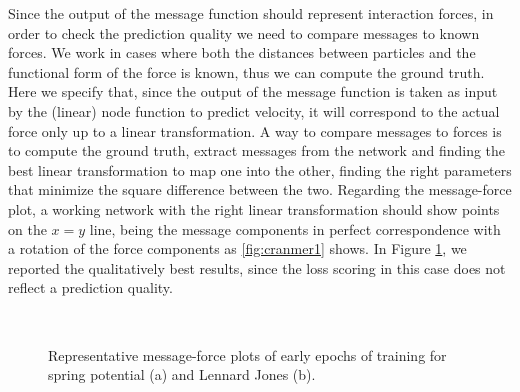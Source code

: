 \documentclass[../../master_thesis_np.tex]{subfiles}
\begin{document}
Since the output of the message function should represent interaction forces, in order to check the prediction quality we need to compare messages to known forces.
We work in cases where both the distances between particles and the functional form of the force is known, thus we can compute the ground truth.
Here we specify that, since the output of the message function is taken as input by the (linear) node function to predict velocity, it will correspond to the actual force only up to a linear transformation.
A way to compare messages to forces is to compute the ground truth, extract messages from the network and finding the best linear transformation to map one into the other, finding the right parameters that minimize the square difference between the two.
Regarding the message-force plot, a working network with the right linear transformation should show points on the $x = y$ line, being the message components in perfect correspondence with a rotation of the force components as \ref{fig:cranmer1} shows.
In Figure \ref{fig:lincomb}, we reported the qualitatively best results, since the loss scoring in this case does not reflect a prediction quality.

\begin{figure}[tp]
	\centering
	\\
	\caption{Representative message-force plots of early epochs of training for spring potential (a) and Lennard Jones (b).}
	\label{fig:lincomb}
\end{figure}
\end{document}
